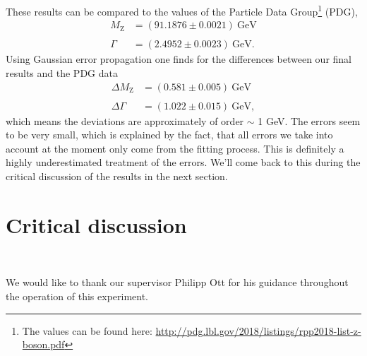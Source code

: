 \documentclass[twocolumn,
			   showpacs,%
               nofootinbib,
               aps,%
               prd,
               notitlepage,
               showkeys,
               10pt]{revtex4-1}
\begin{document}
These results can be compared to the values of the Particle Data Group\footnote{The values can be found here: \url{http://pdg.lbl.gov/2018/listings/rpp2018-list-z-boson.pdf}} (PDG), 
\begin{align}
	M_{\mathrm{Z}}&=(91.1876 \pm 0.0021) \ \mathrm{GeV} \\  \nonumber\\ \Gamma&=(2.4952 \pm 0.0023) \ \mathrm{GeV}.
\end{align} 
Using Gaussian error propagation one finds for the differences between our final results and the PDG data
\begin{align}
	\Delta M_{\mathrm{Z}}&=(0.581 \pm 0.005) \ \mathrm{GeV} \\  \nonumber\\ 
	\Delta\Gamma&=(1.022 \pm 0.015) \ \mathrm{GeV},
\end{align} 
which means the deviations are approximately of order $\sim$ 1 GeV. The errors seem to be very small, which is explained by the fact, that all errors we take into account at the moment only come from the fitting process. This is definitely a highly underestimated treatment of the errors. We'll come back to this during the critical discussion of the results in the next section.
\section{Critical discussion}
\blindtext\\
\blindtext %
\begin{acknowledgments}
We would like to thank our supervisor Philipp Ott for his guidance throughout the operation of this experiment.
\end{acknowledgments}



\nocite{*}
\end{document}
